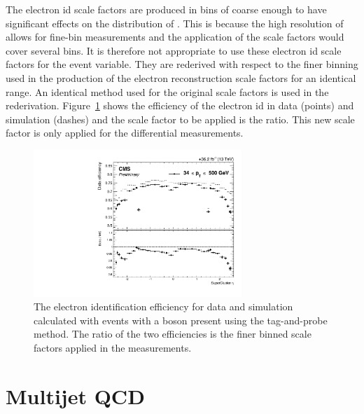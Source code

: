 The electron \acrshort{id} scale factors are produced in bins of \sceta{} coarse enough to have significant effects on the distribution of \LETA{}.
This is because the high resolution of \LETA{} allows for fine-bin measurements and the application of the scale factors would cover several bins.
It is therefore not appropriate to use these electron \acrshort{id} scale factors for the \LETA{} event variable.
They are rederived with respect to the finer binning used in the production of the electron reconstruction scale factors for an identical \pt{} range.
An identical method used for the original scale factors is used in the rederivation.
Figure~\ref{fig:eIDSF} shows the efficiency of the electron \acrshort{id} in data (points) and simulation (dashes) and the scale factor to be applied is the ratio.
This new scale factor is only applied for the \LETA{} differential measurements.
\begin{figure}[htpb]
	\centering
	\includegraphics[width=0.7\textwidth]{Figures/Event_eIDSF.pdf}
	\caption[The electron identification efficiency for data and simulation calculated with events with a \Zboson{} boson present using the tag-and-probe method. The ratio of the two efficiencies is the finer binned scale factors applied in the \LETA{} measurements.]{The electron identification efficiency for data and simulation calculated with events with a \Zboson{} boson present using the tag-and-probe method. The ratio of the two efficiencies is the finer binned scale factors applied in the \LETA{} measurements.}
	\label{fig:eIDSF}
\end{figure}

\section{Multijet QCD} %
\label{sec:multijet_qcd}

